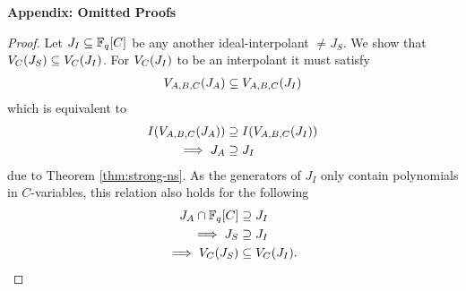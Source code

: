 \begin{center}
{\Large \bf Appendix: Omitted Proofs}
\end{center}


\par {} 
\begin{proof}
Let $J_I \subseteq {\mathbb{F}}_{q}[C]$ be any another ideal-interpolant $\neq
J_S$. We show that ${V_C}(J_S) \subseteq {V_C}(J_I)$. For ${V_C}(J_I)$
to be an interpolant it must satisfy 
\begin{align*}
{V_{A,B,C}}(J_A) \subseteq {V_{A,B,C}}(J_I)
\end{align*}
which is equivalent to 
\begin{align*}
I({V_{A,B,C}}(J_A)) &\supseteq I({V_{A,B,C}}(J_I)) \\
\implies J_A &\supseteq J_I  
\end{align*}
due to Theorem \ref{thm:strong-ns}.
As the generators of $J_I$ only contain polynomials in $C$-variables,
this relation also holds for the following
\begin{align*}
J_A \cap {\mathbb{F}}_{q}[C] &\supseteq J_I \\
\implies J_S &\supseteq J_I \\
\implies {V_C}(J_S) &\subseteq {V_C}(J_I).
\end{align*} 



\end{proof}

\par {} 


